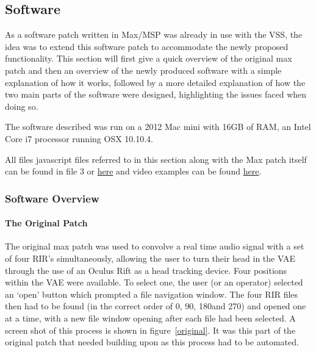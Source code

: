 \documentclass[../../main.tex]{subfiles}
\begin{document}
\lstset{language=Java} 
	\subsection{Software}
	\label{software}
		
		As a software patch written in Max/MSP was already in use with the \ac{VSS}, the idea was to extend this software patch to accommodate the newly proposed functionality. This section will first give a quick overview of the original max patch and then an overview of the newly produced software with a simple explanation of how it works, followed by a more detailed explanation of how the two main parts of the software were designed, highlighting the issues faced when doing so.

		The software described was run on a 2012 Mac mini with 16GB of RAM, an Intel Core i7 processor running OSX 10.10.4.

		All files javascript files referred to in this section along with the Max patch itself can be found in file 3 or \href{http://lt669.github.io/pages/javascripts.html}{here} and video examples can be found \href{http://lt669.github.io/pages/videos.html}{here}.

		\subsubsection{Software Overview}

			\paragraph{The Original Patch}
			\label{softwareoverview:original}
				The original max patch was used to convolve a real time audio signal with a set of four \ac{RIR}'s simultaneously, allowing the user to turn their head in the \ac{VAE} through the use of an Oculus Rift as a head tracking device. Four positions within the \ac{VAE} were available. To select one, the user (or an operator) selected an `open' button which prompted a file navigation window. The four \ac{RIR} files then had to be found (in the correct order of 0\textdegree, 90\textdegree, 180\textdegree and 270\textdegree) and opened one at a time, with a new file window opening after each file had been selected. A screen shot of this process is shown in figure~\ref{original}. It was this part of the original patch that needed building upon as this process had to be automated.
\end{document}
